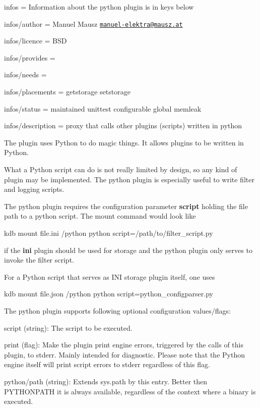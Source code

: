 
\begin{DoxyItemize}
\item infos = Information about the python plugin is in keys below
\item infos/author = Manuel Mausz \href{mailto:manuel-elektra@mausz.at}{\tt manuel-\/elektra@mausz.\+at}
\item infos/licence = B\+SD
\item infos/provides =
\item infos/needs =
\item infos/placements = getstorage setstorage
\item infos/status = maintained unittest configurable global memleak
\item infos/description = proxy that calls other plugins (scripts) written in python
\end{DoxyItemize}

The plugin uses Python to do magic things. It allows plugins to be written in Python.

What a Python script can do is not really limited by design, so any kind of plugin may be implemented. The python plugin is especially useful to write filter and logging scripts.

The python plugin requires the configuration parameter {\bfseries script} holding the file path to a python script. The mount command would look like


\begin{DoxyCode}
kdb mount file.ini /python python script=/path/to/filter\_script.py
\end{DoxyCode}


if the {\bfseries ini} plugin should be used for storage and the python plugin only serves to invoke the filter script.

For a Python script that serves as I\+NI storage plugin itself, one uses


\begin{DoxyCode}
kdb mount file.json /python python script=python\_configparser.py
\end{DoxyCode}


The python plugin supports following optional configuration values/flags\+:


\begin{DoxyItemize}
\item {\ttfamily script} (string)\+: The script to be executed.
\item {\ttfamily print} (flag)\+: Make the plugin print engine errors, triggered by the calls of this plugin, to stderr. Mainly intended for diagnostic. Please note that the Python engine itself will print script errors to stderr regardless of this flag.
\item {\ttfamily python/path} (string)\+: Extends sys.\+path by this entry. Better then P\+Y\+T\+H\+O\+N\+P\+A\+TH it is always available, regardless of the context where a binary is executed.
\end{DoxyItemize}

